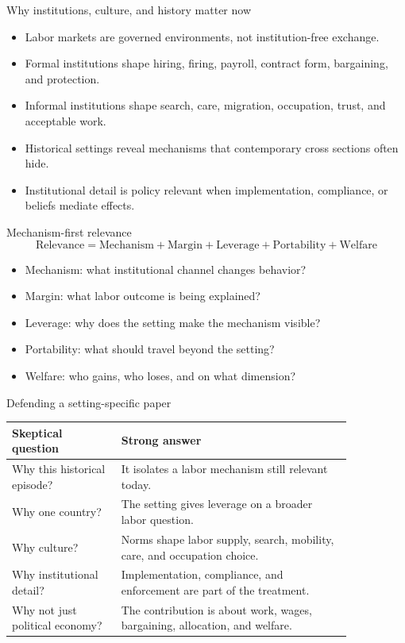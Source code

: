\documentclass[aspectratio=169,11pt]{beamer}
\begin{document}
\begin{frame}{Why institutions, culture, and history matter now}
\begin{itemize}
    \item Labor markets are governed environments, not institution-free exchange.
    \item Formal institutions shape hiring, firing, payroll, contract form, bargaining, and protection.
    \item Informal institutions shape search, care, migration, occupation, trust, and acceptable work.
    \item Historical settings reveal mechanisms that contemporary cross sections often hide.
    \item Institutional detail is policy relevant when implementation, compliance, or beliefs mediate effects.
\end{itemize}
\end{frame}

\begin{frame}{Mechanism-first relevance}
\[
\text{Relevance} =
\text{Mechanism}+\text{Margin}+\text{Leverage}+\text{Portability}+\text{Welfare}
\]

\begin{itemize}
    \item Mechanism: what institutional channel changes behavior?
    \item Margin: what labor outcome is being explained?
    \item Leverage: why does the setting make the mechanism visible?
    \item Portability: what should travel beyond the setting?
    \item Welfare: who gains, who loses, and on what dimension?
\end{itemize}
\end{frame}

\begin{frame}{Defending a setting-specific paper}
\small
\begin{tabular}{p{0.27\linewidth} p{0.58\linewidth}}
\toprule
Skeptical question & Strong answer \\
\midrule
Why this historical episode? & It isolates a labor mechanism still relevant today. \\
Why one country? & The setting gives leverage on a broader labor question. \\
Why culture? & Norms shape labor supply, search, mobility, care, and occupation choice. \\
Why institutional detail? & Implementation, compliance, and enforcement are part of the treatment. \\
Why not just political economy? & The contribution is about work, wages, bargaining, allocation, and welfare. \\
\bottomrule
\end{tabular}
\end{frame}
\end{document}
